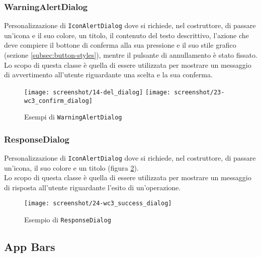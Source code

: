 \subsubsection*{WarningAlertDialog}
\label{subsubsec:warning-alert-dialog}

Personalizzazione di \lstinline{IconAlertDialog} dove si richiede, nel costruttore, di passare un'icona e il suo colore, un titolo, il contenuto del testo descrittivo, l'azione che deve compiere il bottone di conferma alla sua pressione e il suo stile grafico (sezione \ref{subsec:button-styles}), mentre il pulsante di annullamento è stato fissato.\\
Lo scopo di questa classe è quella di essere utilizzata per mostrare un messaggio di avvertimento all'utente riguardante una scelta e la sua conferma.

\begin{figure}[!h] 
    \centering 
    \texttt{[image: screenshot/14-del\_dialog]} 
    \texttt{[image: screenshot/23-wc3\_confirm\_dialog]}
    \caption{Esempi di \lstinline{WarningAlertDialog}}
    \label{fig:warning-alert-dialog}
\end{figure}

\newpage

\subsubsection*{ResponseDialog}
\label{subsubsec:response-dialog}

Personalizzazione di \lstinline{IconAlertDialog} dove si richiede, nel costruttore, di passare un'icona, il suo colore e un titolo (figura \ref{fig:response-dialog}).\\
Lo scopo di questa classe è quella di essere utilizzata per mostrare un messaggio di risposta all'utente riguardante l'esito di un'operazione.\\

\begin{figure}[!h] 
    \centering 
    \texttt{[image: screenshot/24-wc3\_success\_dialog]} 
    \caption{Esempio di \lstinline{ResponseDialog}}
    \label{fig:response-dialog}
\end{figure}

\subsection{App Bars}
\label{subsec:app-bars}

